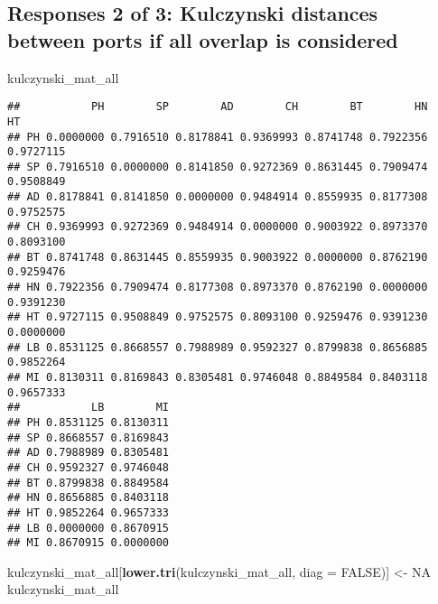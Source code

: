 \documentclass[]{article}
\newenvironment{Shaded}{\begin{snugshade}}{\end{snugshade}}
\newcommand{\KeywordTok}[1]{\textcolor[rgb]{0.13,0.29,0.53}{\textbf{#1}}}
\newcommand{\DataTypeTok}[1]{\textcolor[rgb]{0.13,0.29,0.53}{#1}}
\newcommand{\StringTok}[1]{\textcolor[rgb]{0.31,0.60,0.02}{#1}}
\newcommand{\OtherTok}[1]{\textcolor[rgb]{0.56,0.35,0.01}{#1}}
\newcommand{\NormalTok}[1]{#1}
\begin{document}
\subsection{Responses 2 of 3: Kulczynski distances between ports if all
overlap is
considered}\label{responses-2-of-3-kulczynski-distances-between-ports-if-all-overlap-is-considered-1}

\begin{Shaded}
\begin{Highlighting}[]
\NormalTok{kulczynski_mat_all}
\end{Highlighting}
\end{Shaded}

\begin{verbatim}
##           PH        SP        AD        CH        BT        HN        HT
## PH 0.0000000 0.7916510 0.8178841 0.9369993 0.8741748 0.7922356 0.9727115
## SP 0.7916510 0.0000000 0.8141850 0.9272369 0.8631445 0.7909474 0.9508849
## AD 0.8178841 0.8141850 0.0000000 0.9484914 0.8559935 0.8177308 0.9752575
## CH 0.9369993 0.9272369 0.9484914 0.0000000 0.9003922 0.8973370 0.8093100
## BT 0.8741748 0.8631445 0.8559935 0.9003922 0.0000000 0.8762190 0.9259476
## HN 0.7922356 0.7909474 0.8177308 0.8973370 0.8762190 0.0000000 0.9391230
## HT 0.9727115 0.9508849 0.9752575 0.8093100 0.9259476 0.9391230 0.0000000
## LB 0.8531125 0.8668557 0.7988989 0.9592327 0.8799838 0.8656885 0.9852264
## MI 0.8130311 0.8169843 0.8305481 0.9746048 0.8849584 0.8403118 0.9657333
##           LB        MI
## PH 0.8531125 0.8130311
## SP 0.8668557 0.8169843
## AD 0.7988989 0.8305481
## CH 0.9592327 0.9746048
## BT 0.8799838 0.8849584
## HN 0.8656885 0.8403118
## HT 0.9852264 0.9657333
## LB 0.0000000 0.8670915
## MI 0.8670915 0.0000000
\end{verbatim}

\begin{Shaded}
\begin{Highlighting}[]
\NormalTok{kulczynski_mat_all[}\KeywordTok{lower.tri}\NormalTok{(kulczynski_mat_all, }\DataTypeTok{diag =} \OtherTok{FALSE}\NormalTok{)] <-}\StringTok{ }\OtherTok{NA}
\NormalTok{kulczynski_mat_all}
\end{Highlighting}
\end{Shaded}
\end{document}
